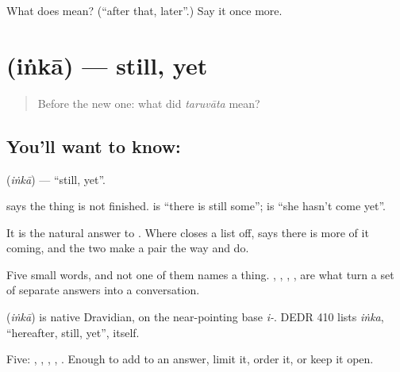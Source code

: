 \begin{tcolorbox}[breakable,colback=teal!4,colframe=teal!35!black,title={Before you move on}]
What does  mean? (\textquotedblleft{}after that, later\textquotedblright{}.) Say it once more.
\end{tcolorbox}
\section[\texorpdfstring{\te{ఇంకా} (iṅkā)}{ఇంకా (iṅkā)}]{ (iṅkā) — still, yet}

\label{lesson:TE-C64-still}



\begin{quote}
Before the new one: what did \emph{taruvāta} mean?
\end{quote}

\subsection*{You'll want to know: }
\textbf{} (\emph{iṅkā}) — \textquotedblleft{}still, yet\textquotedblright{}.

 says the thing is not finished.   is \textquotedblleft{}there is still some\textquotedblright{};   is \textquotedblleft{}she hasn't come yet\textquotedblright{}.

It is the natural answer to . Where  closes a list off,  says there is more of it coming, and the two make a pair the way  and  do.

Five small words, and not one of them names a thing. , , , ,  are what turn a set of separate answers into a conversation.

\begin{cousinweb}
\textbf{} (\emph{iṅkā}) is native Dravidian, on the near-pointing base \emph{i-}. DEDR 410 lists \emph{iṅka}, \textquotedblleft{}hereafter, still, yet\textquotedblright{}, itself.
\end{cousinweb}

\begin{grammarlens}[title={What you've built}]
Five: , , , , . Enough to add to an answer, limit it, order it, or keep it open.
\end{grammarlens}

